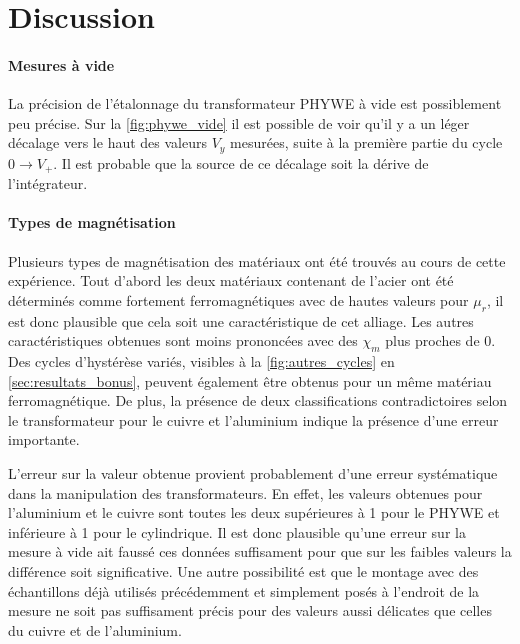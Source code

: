 \section{Discussion}

\paragraph*{Mesures à vide}
La précision de l'étalonnage du transformateur PHYWE à vide est possiblement peu précise. Sur la \autoref{fig:phywe_vide} il est possible de voir qu'il y a un léger décalage vers le haut des valeurs \(V_y\) mesurées, suite à la première partie du cycle \(0 \rightarrow V_+\). Il est probable que la source de ce décalage soit la dérive de l'intégrateur.

\paragraph*{Types de magnétisation}
Plusieurs types de magnétisation des matériaux ont été trouvés au cours de cette expérience. Tout d'abord les deux matériaux contenant de l'acier ont été déterminés comme fortement ferromagnétiques avec de hautes valeurs pour \(\mu_r\), il est donc plausible que cela soit une caractéristique de cet alliage. Les autres caractéristiques obtenues sont moins prononcées avec des \(\chi_m\) plus proches de 0. Des cycles d'hystérèse variés, visibles à la \autoref{fig:autres_cycles} en \autoref{sec:resultats_bonus}, peuvent également être obtenus pour un même matériau ferromagnétique. De plus, la présence de deux classifications contradictoires selon le transformateur pour le cuivre et l'aluminium indique la présence d'une erreur importante.

L'erreur sur la valeur obtenue provient probablement d'une erreur systématique dans la manipulation des transformateurs. En effet, les valeurs obtenues pour l'aluminium et le cuivre sont toutes les deux supérieures à 1 pour le PHYWE et inférieure à 1 pour le cylindrique. Il est donc plausible qu'une erreur sur la mesure à vide ait faussé ces données suffisament pour que sur les faibles valeurs la différence soit significative. Une autre possibilité est que le montage avec des échantillons déjà utilisés précédemment et simplement posés à l'endroit de la mesure ne soit pas suffisament précis pour des valeurs aussi délicates que celles du cuivre et de l'aluminium.

